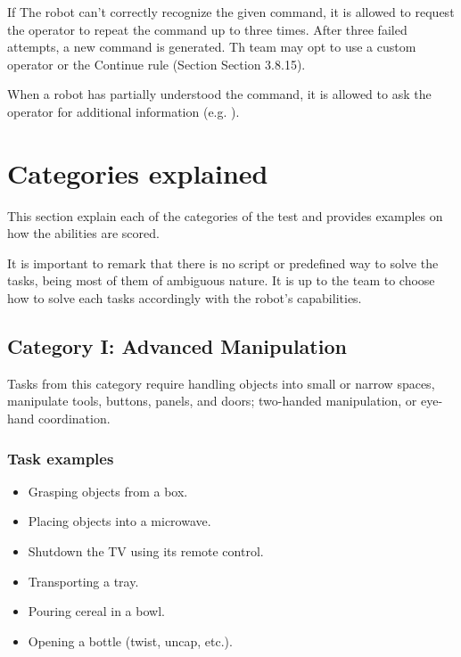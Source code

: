 If The robot can't correctly recognize the given command, it is allowed to request the operator to repeat the command up to three times. After three failed attempts, a new command is generated. Th team may opt to use a custom operator or the Continue rule (Section Section 3.8.15).

When a robot has partially understood the command, it is allowed to ask the operator for additional information (e.g. \textit{}).

%
%
\section{Categories explained}
\label{sec:eegpsr-categories-explained}
This section explain each of the categories of the test and provides examples on how the abilities are scored.

It is important to remark that there is no script or predefined way to solve the tasks, being most of them of ambiguous nature. It is up to the team to choose how to solve each tasks accordingly with the robot's capabilities.


%
%
\subsection{Category I: Advanced Manipulation}
\label{sec:eegpsr-category1-explained}
Tasks from this category require handling objects into small or narrow spaces, manipulate tools, buttons, panels, and doors; two-handed manipulation, or eye-hand coordination. 

\subsubsection{Task examples}
\begin{itemize}
	\item Grasping objects from a box.
	\item Placing objects into a microwave.
	\item Shutdown the TV using its remote control.
	\item Transporting a tray.
	\item Pouring cereal in a bowl.
	\item Opening a bottle (twist, uncap, etc.).
\end{itemize}

